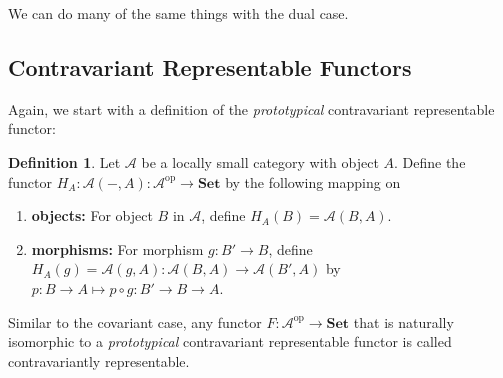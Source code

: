 \documentclass[11pt]{article}
\theoremstyle{definition}
\newtheorem*{defn}{Definition}
\theoremstyle{definition}
\theoremstyle{plain}
\theoremstyle{plain}
\theoremstyle{plain}
\begin{document}
We can do many of the same things with the dual case.

\subsection*{Contravariant Representable Functors}

Again, we start with a definition of the \emph{prototypical} contravariant representable functor:

\begin{defn}
Let $\mathscr{A}$ be a locally small category with object $A$. Define the functor $H_{A}:\mathscr{A}(-,A):\mathscr{A}^{\text{op}} \to \textbf{Set}$ by the following mapping on
\begin{enumerate}
\item \textbf{objects:} For object $B$ in $\mathscr{A}$, define $H_{A}(B)=\mathscr{A}(B,A)$.
\item \textbf{morphisms:} For morphism $g:B' \to B$, define $H_{A}(g)=\mathscr{A}(g,A):\mathscr{A}(B,A) \to \mathscr{A}(B',A)$ by $p:B \to A \mapsto p \circ g: B' \to B \to A$.
\end{enumerate}
\end{defn}

Similar to the covariant case, any functor $F:\mathscr{A}^{\text{op}} \to \textbf{Set}$ that is naturally isomorphic to a \emph{prototypical} contravariant representable functor is called contravariantly representable.
\end{document}
